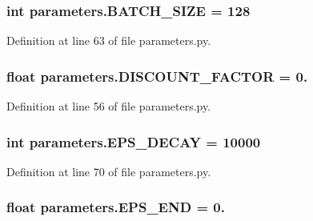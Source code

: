 \subsubsection[{\texorpdfstring{B\+A\+T\+C\+H\+\_\+\+S\+I\+ZE}{BATCH_SIZE}}]{\setlength{\rightskip}{0pt plus 5cm}int parameters.\+B\+A\+T\+C\+H\+\_\+\+S\+I\+ZE = 128}\hypertarget{namespaceparameters_a2d37d9950f7a887014021ab455282af6}{}\label{namespaceparameters_a2d37d9950f7a887014021ab455282af6}


Definition at line 63 of file parameters.\+py.

\subsubsection[{\texorpdfstring{D\+I\+S\+C\+O\+U\+N\+T\+\_\+\+F\+A\+C\+T\+OR}{DISCOUNT_FACTOR}}]{\setlength{\rightskip}{0pt plus 5cm}float parameters.\+D\+I\+S\+C\+O\+U\+N\+T\+\_\+\+F\+A\+C\+T\+OR = 0.}\hypertarget{namespaceparameters_a70176024e0f585c846365800f1c7819c}{}\label{namespaceparameters_a70176024e0f585c846365800f1c7819c}


Definition at line 56 of file parameters.\+py.

\subsubsection[{\texorpdfstring{E\+P\+S\+\_\+\+D\+E\+C\+AY}{EPS_DECAY}}]{\setlength{\rightskip}{0pt plus 5cm}int parameters.\+E\+P\+S\+\_\+\+D\+E\+C\+AY = 10000}\hypertarget{namespaceparameters_ab9a88c663385563b35331bbea5c4a74b}{}\label{namespaceparameters_ab9a88c663385563b35331bbea5c4a74b}


Definition at line 70 of file parameters.\+py.

\subsubsection[{\texorpdfstring{E\+P\+S\+\_\+\+E\+ND}{EPS_END}}]{\setlength{\rightskip}{0pt plus 5cm}float parameters.\+E\+P\+S\+\_\+\+E\+ND = 0.}\hypertarget{namespaceparameters_a3765f189d3af4815766ded3bffcba1e2}{}\label{namespaceparameters_a3765f189d3af4815766ded3bffcba1e2}


